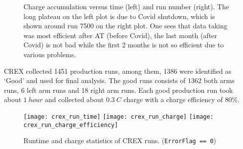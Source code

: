 \begin{figure}[h!]
    \caption{Charge accumulation versus time (left) and run number (right). The
    long plateau on the left plot is due to Covid shutdown, which is shown around
    run 7500 on the right plot. One sees that data taking was most efficient after
    AT (before Covid), the last month (after Covid) is not bad while the 
    first 2 months is not so efficient due to various problems.}
\end{figure}

CREX collected 1451 production runs, among them, 1386 were identified as `Good'
and used for final analysis. The good runs consists of 1362 both arms runs,
6 left arm runs and 18 right arm runs. Each good production run took about $1\ hour$
and collected about $0.3\ C$ charge with a charge efficiency of 80\%.
\begin{figure}[!h]
    \texttt{[image: crex\_run\_time]}
    \texttt{[image: crex\_run\_charge]}
    \texttt{[image: crex\_run\_charge\_efficiency]}
    \caption{Runtime and charge statistics of CREX runs. (\texttt{ErrorFlag == 0})}
\end{figure}

